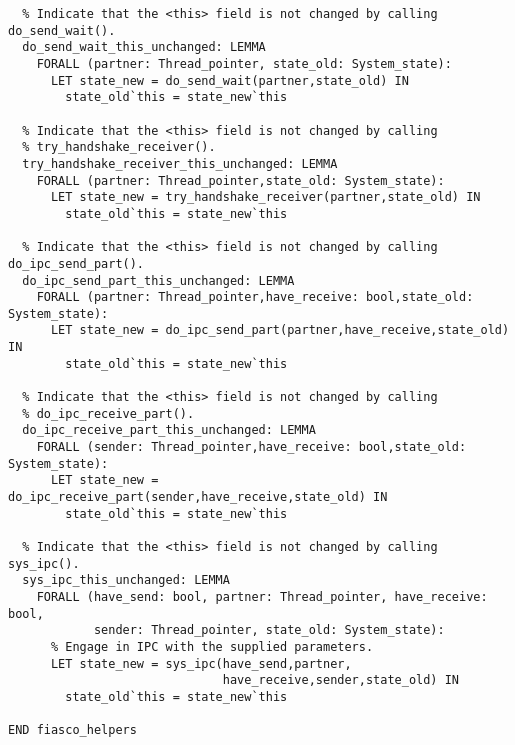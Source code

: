 \begin{lstlisting}
  % Indicate that the <this> field is not changed by calling do_send_wait().
  do_send_wait_this_unchanged: LEMMA
    FORALL (partner: Thread_pointer, state_old: System_state):
      LET state_new = do_send_wait(partner,state_old) IN
        state_old`this = state_new`this
 
  % Indicate that the <this> field is not changed by calling
  % try_handshake_receiver().
  try_handshake_receiver_this_unchanged: LEMMA
    FORALL (partner: Thread_pointer,state_old: System_state):
      LET state_new = try_handshake_receiver(partner,state_old) IN
        state_old`this = state_new`this

  % Indicate that the <this> field is not changed by calling do_ipc_send_part().
  do_ipc_send_part_this_unchanged: LEMMA
    FORALL (partner: Thread_pointer,have_receive: bool,state_old: System_state):
      LET state_new = do_ipc_send_part(partner,have_receive,state_old) IN
        state_old`this = state_new`this

  % Indicate that the <this> field is not changed by calling
  % do_ipc_receive_part().
  do_ipc_receive_part_this_unchanged: LEMMA
    FORALL (sender: Thread_pointer,have_receive: bool,state_old: System_state):
      LET state_new = do_ipc_receive_part(sender,have_receive,state_old) IN
        state_old`this = state_new`this
 
  % Indicate that the <this> field is not changed by calling sys_ipc().
  sys_ipc_this_unchanged: LEMMA
    FORALL (have_send: bool, partner: Thread_pointer, have_receive: bool,
            sender: Thread_pointer, state_old: System_state):
      % Engage in IPC with the supplied parameters.
      LET state_new = sys_ipc(have_send,partner,
                              have_receive,sender,state_old) IN
        state_old`this = state_new`this

END fiasco_helpers
\end{lstlisting}